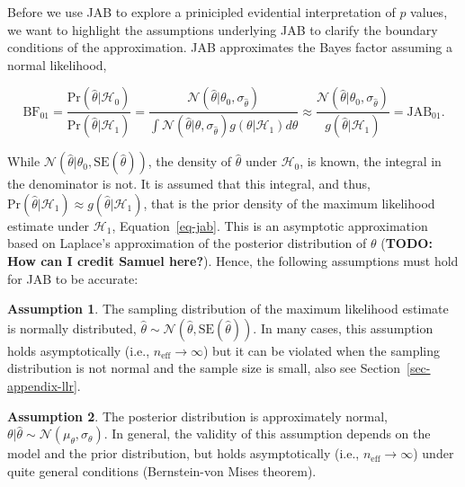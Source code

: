 \documentclass[
  man,
  floatsintext,
  longtable,
  nolmodern,
  notxfonts,
  notimes,
  colorlinks=true,linkcolor=blue,citecolor=blue,urlcolor=blue]{apa7}
\begin{document}
Before we use JAB to explore a prinicipled evidential interpretation of
\(p\) values, we want to highlight the assumptions underlying JAB to
clarify the boundary conditions of the approximation. JAB approximates
the Bayes factor assuming a normal likelihood,

\[
\text{BF}_{01} = \frac{\text{Pr}(\hat\theta | \mathcal{H}_0)}{\text{Pr}(\hat\theta | \mathcal{H}_1)} = \frac{\mathcal{N}(\hat\theta | \theta_0, \sigma_{\hat\theta})}{\int \mathcal{N}(\hat\theta | \theta, \sigma_{\hat\theta}) g(\theta | \mathcal{H}_1) d\theta} \approx \frac{\mathcal{N}(\hat\theta | \theta_0, \sigma_{\hat\theta})}{g(\hat\theta | \mathcal{H}_1)} = \text{JAB}_{01}.
\]

While \(\mathcal{N}(\hat\theta | \theta_0, \text{SE}(\hat\theta))\), the
density of \(\hat\theta\) under \(\mathcal{H}_0\), is known, the
integral in the denominator is not. It is assumed that this integral,
and thus,
\(\text{Pr}(\hat\theta | \mathcal{H}_1) \approx g(\hat\theta | \mathcal{H}_1)\),
that is the prior density of the maximum likelihood estimate under
\(\mathcal{H}_1\), Equation~\ref{eq-jab}. This is an asymptotic
approximation based on Laplace's approximation of the posterior
distribution of \(\theta\) (\textbf{TODO: How can I credit Samuel
here?}). Hence, the following assumptions must hold for JAB to be
accurate:

\textbf{Assumption 1}. The sampling distribution of the maximum
likelihood estimate is normally distributed,
\(\hat\theta \sim \mathcal{N}(\hat\theta, \text{SE}(\hat\theta))\). In
many cases, this assumption holds asymptotically (i.e.,
\(n_\text{eff} \to \infty\)) but it can be violated when the sampling
distribution is not normal and the sample size is small, also see
Section~\ref{sec-appendix-llr}.

\textbf{Assumption 2}. The posterior distribution is approximately
normal,
\(\theta | \hat\theta \sim \mathcal{N}(\mu_\theta, \sigma_\theta)\). In
general, the validity of this assumption depends on the model and the
prior distribution, but holds asymptotically (i.e.,
\(n_\text{eff} \to \infty\)) under quite general conditions
(Bernstein-von Mises theorem).
\end{document}
